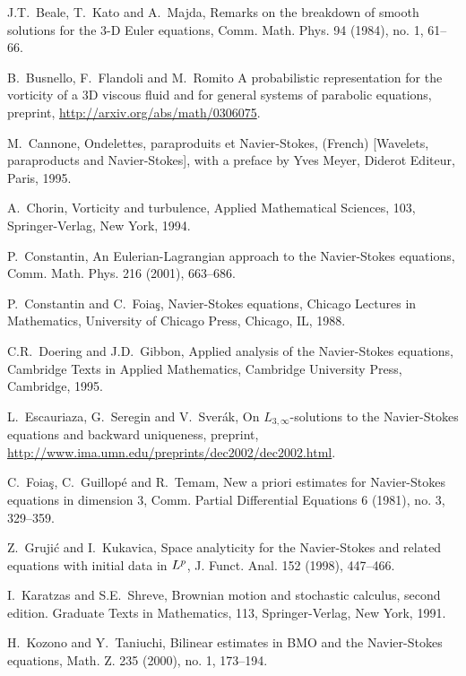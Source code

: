 \documentclass[12pt]{amsart}
\theoremstyle{remark}
\begin{document}
\begin{thebibliography}{999}

J.T.~Beale, T.~Kato and A.~Majda, 
Remarks on the breakdown of smooth solutions for the $3$-D Euler equations,  
Comm. Math. Phys.  94  (1984),  no. 1, 61--66.

B.~Busnello, F.~Flandoli and M.~Romito
A probabilistic representation for the vorticity of a 3D viscous 
fluid and for general systems of parabolic equations, preprint,
\url{http://arxiv.org/abs/math/0306075}.

M.~Cannone,  Ondelettes, paraproduits et Navier-Stokes, (French) 
[Wavelets, paraproducts and Navier-Stokes], 
with a preface by Yves Meyer, 
Diderot Editeur, Paris, 1995.

A.~Chorin,
Vorticity and turbulence,
Applied Mathematical Sciences, 103,
Springer-Verlag, New York, 1994.

P.~Constantin,
An Eulerian-Lagrangian approach to the Navier-Stokes equations, 
Comm. Math. Phys.  216  (2001), 663--686.

P.~Constantin and C.~Foia\c s, 
Navier-Stokes equations, 
Chicago Lectures in Mathematics,
University of Chicago Press, Chicago, IL, 1988.

C.R.~Doering and J.D.~Gibbon,
Applied analysis of the Navier-Stokes equations,
Cambridge Texts in Applied Mathematics,
Cambridge University Press, Cambridge, 1995.

L.~Escauriaza, G.~Seregin and V.~Sver\'ak,
On 
$L_{3,\infty}$-solutions to the Navier-Stokes equations and backward 
uniqueness,
preprint, \url{http://www.ima.umn.edu/preprints/dec2002/dec2002.html}.

C.~Foia\c s, C.~Guillop\'e and R.~Temam,
New a priori estimates for Navier-Stokes equations in dimension $3$,
Comm. Partial Differential Equations 6 (1981), no. 3, 329--359.

Z.~Gruji\'c and I.~Kukavica,
Space analyticity for the Navier-Stokes and related 
equations with initial data in $L\sp p$,
J. Funct. Anal.  152  (1998), 447--466.

I.~Karatzas and S.E.~Shreve,
Brownian motion and stochastic calculus,
second edition. Graduate Texts in Mathematics, 113,
Springer-Verlag, New York, 1991.

H.~Kozono and Y.~Taniuchi, 
Bilinear estimates in BMO and the Navier-Stokes equations,  
Math. Z.  235  (2000),  no. 1, 173--194.


\end{thebibliography}
\end{document}
